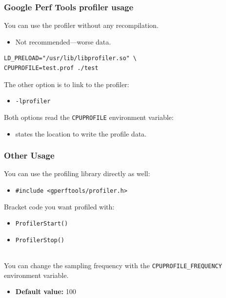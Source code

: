 \begin{frame}[fragile]
  \frametitle{Google Perf Tools profiler usage}

  
    You can use the profiler without any recompilation.
      \begin{itemize}
        \item Not recommended---worse data.
      \end{itemize}

  \begin{lstlisting}
LD_PRELOAD="/usr/lib/libprofiler.so" \
CPUPROFILE=test.prof ./test
  \end{lstlisting}

     The other option is to link to the profiler:
      \begin{itemize}
        \item {\tt -lprofiler}
      \end{itemize}
    Both options read the {\tt CPUPROFILE} environment variable:
      \begin{itemize}
        \item states the location to write the profile data.
      \end{itemize}
  
\end{frame}

\begin{frame}[fragile]
  \frametitle{Other Usage}

  
     You can use the profiling library directly as well:
      \begin{itemize}
        \item {\tt \#include <gperftools/profiler.h>}
      \end{itemize}
     Bracket code you want profiled with:
      \begin{itemize}
        \item {\tt ProfilerStart()}
        \item {\tt ProfilerStop()}
      \end{itemize}~\\
    
    You can change the sampling frequency with the
      {\tt CPUPROFILE\_FREQUENCY} environment variable.
      \begin{itemize}
        \item {\bf Default value:} 100
      \end{itemize}
  
\end{frame}

